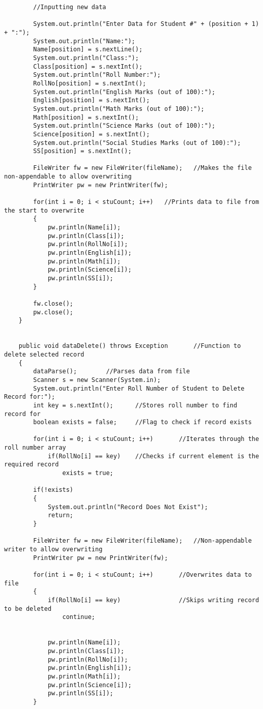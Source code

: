 \documentclass[ProgramminAssignment.tex]{subfiles}
\begin{document}
\begin{lstlisting}
		//Inputting new data
		
		System.out.println("Enter Data for Student #" + (position + 1) + ":");
		System.out.println("Name:");
		Name[position] = s.nextLine();
		System.out.println("Class:");
		Class[position] = s.nextInt();
		System.out.println("Roll Number:");
		RollNo[position] = s.nextInt();
		System.out.println("English Marks (out of 100):");
		English[position] = s.nextInt();
		System.out.println("Math Marks (out of 100):");
		Math[position] = s.nextInt();
		System.out.println("Science Marks (out of 100):");
		Science[position] = s.nextInt();
		System.out.println("Social Studies Marks (out of 100):");
		SS[position] = s.nextInt();
		
		FileWriter fw = new FileWriter(fileName);	//Makes the file non-appendable to allow overwriting
		PrintWriter pw = new PrintWriter(fw);	
		
		for(int i = 0; i < stuCount; i++)	//Prints data to file from the start to overwrite
		{
			pw.println(Name[i]);
			pw.println(Class[i]);
			pw.println(RollNo[i]);
			pw.println(English[i]);
			pw.println(Math[i]);
			pw.println(Science[i]);
			pw.println(SS[i]);
		}
		
		fw.close();
		pw.close();
	}
	
	
	public void dataDelete() throws Exception		//Function to delete selected record
	{
		dataParse();		//Parses data from file
		Scanner s = new Scanner(System.in);
		System.out.println("Enter Roll Number of Student to Delete Record for:");
		int key = s.nextInt();		//Stores roll number to find record for
		boolean exists = false;		//Flag to check if record exists
		
		for(int i = 0; i < stuCount; i++)		//Iterates through the roll number array
			if(RollNo[i] == key)	//Checks if current element is the required record
				exists = true;
		
		if(!exists)
		{
			System.out.println("Record Does Not Exist");
			return;
		}
		
		FileWriter fw = new FileWriter(fileName);	//Non-appendable writer to allow overwriting
		PrintWriter pw = new PrintWriter(fw);
		
		for(int i = 0; i < stuCount; i++)		//Overwrites data to file
		{	
			if(RollNo[i] == key)				//Skips writing record to be deleted
				continue;
			
			
			pw.println(Name[i]);
			pw.println(Class[i]);
			pw.println(RollNo[i]);
			pw.println(English[i]);
			pw.println(Math[i]);
			pw.println(Science[i]);
			pw.println(SS[i]);
		}
		

\end{lstlisting}
\end{document}
